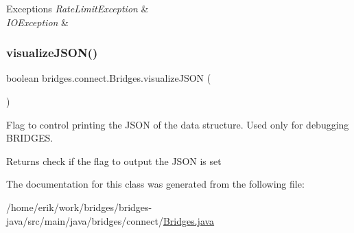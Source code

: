 \begin{DoxyExceptions}{Exceptions}
{\em Rate\+Limit\+Exception} & \\
\hline
{\em I\+O\+Exception} & \\
\hline
\end{DoxyExceptions}
\mbox{\label{classbridges_1_1connect_1_1_bridges_afd3c63780396e92c94c923037385b31d}} 
\subsubsection{\texorpdfstring{visualize\+J\+S\+O\+N()}{visualizeJSON()}}
{\footnotesize\ttfamily boolean bridges.\+connect.\+Bridges.\+visualize\+J\+S\+ON (\begin{DoxyParamCaption}{ }\end{DoxyParamCaption})}



Flag to control printing the J\+S\+ON of the data structure. Used only for debugging B\+R\+I\+D\+G\+ES. 

\begin{DoxyReturn}{Returns}
check if the flag to output the J\+S\+ON is set 
\end{DoxyReturn}


The documentation for this class was generated from the following file\+:\begin{DoxyCompactItemize}
\item 
/home/erik/work/bridges/bridges-\/java/src/main/java/bridges/connect/\hyperlink{_bridges_8java}{Bridges.\+java}\end{DoxyCompactItemize}
